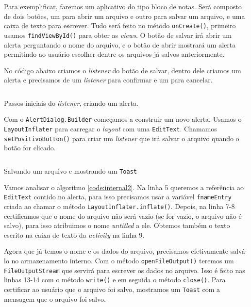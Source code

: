\documentclass[a4paper,12pt,brazil]{book}
\begin{document}
\begin{singlespace}
		Para exemplificar, faremos um aplicativo do tipo bloco de notas. Será composto de dois botões, um para abrir um arquivo e outro para salvar um arquivo, e uma caixa de texto para escrever. Tudo será feito no método \texttt{onCreate()}, primeiro  usamos \texttt{findViewById()} para obter as \emph{views}. O botão de salvar irá abrir um alerta perguntando o nome do arquivo, e o botão de abrir mostrará um alerta permitindo ao usuário escolher dentre os arquivos já salvos anteriormente.

		No código abaixo criamos o \emph{listener} do botão de salvar, dentro dele criamos um alerta e precisamos de um \emph{listener} para confirmar e um para cancelar.

		\begin{listing}[H]
		\inputminted[linenos=true,fontsize=\small,frame=lines, framesep=2mm, tabsize=2,numbersep=5pt]{java}{src/api/storage/internal1.java}
		\caption{Passos iniciais do \emph{listener}, criando um alerta.}
		\label{code:internal1}
		\end{listing} 	
		\newpage
		Com o \texttt{AlertDialog.Builder} começamos a construir um novo alerta. Usamos o \texttt{LayoutInflater} para carregar o \emph{layout} com uma \texttt{EditText}.
		Chamamos \texttt{setPositivoButton()} para criar um \emph{listener} que irá salvar o arquivo quando o botão for clicado.

		\begin{listing}[H]
		\inputminted[linenos=true,fontsize=\small,frame=lines, framesep=2mm, tabsize=2,numbersep=5pt]{java}{src/api/storage/internal2.java}
		\caption{Salvando um arquivo e mostrando um \texttt{Toast}}
		\label{code:internal2}
		\end{listing} 	

		Vamos analisar o algoritmo \ref{code:internal2}. Na linha 5 queremos a referência ao \texttt{EditText} contido no alerta, para isso precisamos usar a variável \texttt{fnameEntry} criada ao chamar o método \texttt{LayoutInflater.inflate()}. Depois, na linha 7-8 certificamos que o nome do arquivo não será vazio (se for vazio, o arquivo não é salvo), para isso atribuimos o nome \emph{untitled} a ele. Obtemos também o texto escrito na caixa de texto da \emph{activity} na linha 9.

		Agora que já temos o nome e os dados do arquivo, precisamos efetivamente salvá-lo no armazenamento interno. Com o método \texttt{openFileOutput()} teremos um \texttt{FileOutputStream} que servirá para escrever os dados no arquivo. Isso é feito nas linhas 13-14 com o método \texttt{write()} e em seguida o método \texttt{close()}.
		Para certificar ao usuário que o arquivo foi salvo, mostramos um \texttt{Toast} com a mensagem que o arquivo foi salvo.


\end{singlespace}
\end{document}
